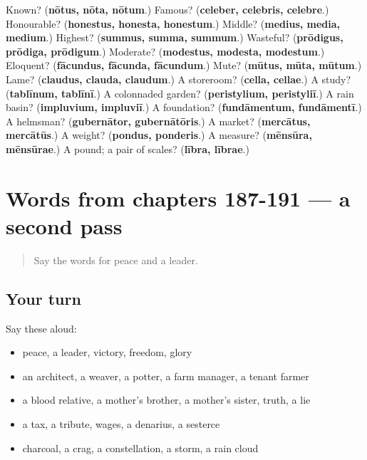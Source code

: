 \begin{tcolorbox}[breakable,colback=teal!4,colframe=teal!35!black,title={Before you move on}]
Known? (\textbf{nōtus, nōta, nōtum}.) Famous? (\textbf{celeber, celebris, celebre}.) Honourable? (\textbf{honestus, honesta, honestum}.) Middle? (\textbf{medius, media, medium}.) Highest? (\textbf{summus, summa, summum}.) Wasteful? (\textbf{prōdigus, prōdiga, prōdigum}.) Moderate? (\textbf{modestus, modesta, modestum}.) Eloquent? (\textbf{fācundus, fācunda, fācundum}.) Mute? (\textbf{mūtus, mūta, mūtum}.) Lame? (\textbf{claudus, clauda, claudum}.) A storeroom? (\textbf{cella, cellae}.) A study? (\textbf{tablīnum, tablīnī}.) A colonnaded garden? (\textbf{peristylium, peristyliī}.) A rain basin? (\textbf{impluvium, impluviī}.) A foundation? (\textbf{fundāmentum, fundāmentī}.) A helmsman? (\textbf{gubernātor, gubernātōris}.) A market? (\textbf{mercātus, mercātūs}.) A weight? (\textbf{pondus, ponderis}.) A measure? (\textbf{mēnsūra, mēnsūrae}.) A pound; a pair of scales? (\textbf{lībra, lībrae}.)
\end{tcolorbox}
\section[(dialogue)]{Words from chapters 187-191 — a second pass}

\label{lesson:LA-R191-second-pass-words-from-chapters-187-191}



\begin{quote}
Say the words for peace and a leader.
\end{quote}

\subsection*{Your turn}
Say these aloud:

\begin{itemize}
\raggedright
  \item peace, a leader, victory, freedom, glory
  \item an architect, a weaver, a potter, a farm manager, a tenant farmer
  \item a blood relative, a mother's brother, a mother's sister, truth, a lie
  \item a tax, a tribute, wages, a denarius, a sesterce
  \item charcoal, a crag, a constellation, a storm, a rain cloud
\end{itemize}

